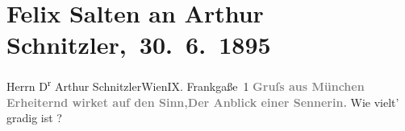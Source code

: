 

         
         \renewcommand{\erwaehntePersonen}{Personen: Felix Salten}
         \renewcommand{\erwaehnteOrte}{Orte: Frankgasse 1, IX., Alsergrund, München, Wien}
         \renewcommand{\erwaehnteWerke}{}
               \section[ Felix Salten an Arthur Schnitzler, 30. 6. 1895]{ Felix Salten an Arthur Schnitzler, 30. 6. 1895}\nopagebreak{}\rehead{ }\begin{ledgroupsized}[t]{13cm}\normalsize\beginnumbering \toendnotes[C]{\smallbreak\pagebreak[2]} 
\pstart{}{\pb}Herrn D\textsuperscript{r} Arthur Schnitzler\pend{}\pstart{}Wien\pend{}\pstart{}IX. Frankgaße 1\pend{}{\bigskip}\pstart
           \noindent{}\centering{}{\pb}\textcolor{gray}{\textbf{Gruſs aus München}}\pend
           \stanza{}\textcolor{gray}{\textbf{Erheiternd wirket auf den Sinn,}}\textcolor{gray}{\textbf{Der Anblick einer Sennerin.}}\stanzaend{}\pstart
           Wie vielt’ gradig ist ? \pend
           
         
         \endnumbering{}\end{ledgroupsized}  \newcommand{\dateiname}{L03157}\newcommand{\titel}{Felix Salten an Arthur Schnitzler, 30. 6. 1895}\newcommand{\editorInnen}{Martin Anton Müller und Laura Untner}
      